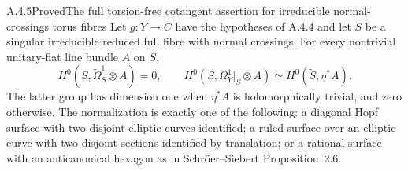 \begin{statement}{A.4.5}{Proved}{The full torsion-free cotangent assertion for irreducible normal-crossings torus fibres}
Let $g:Y\to C$ have the hypotheses of A.4.4 and let $S$ be a singular irreducible reduced full fibre with normal crossings. For every nontrivial unitary-flat line bundle $A$ on $S$,
\[
H^0(S,\widetilde\Omega_S^1\otimes A)=0,
\qquad
H^0(S,\Omega_Y^1|_S\otimes A)
 \simeq H^0(\widetilde S,\eta^*A).
\tag{A.17}
\]
The latter group has dimension one when $\eta^*A$ is holomorphically trivial, and zero otherwise. The normalization is exactly one of the following: a diagonal Hopf surface with two disjoint elliptic curves identified; a ruled surface over an elliptic curve with two disjoint sections identified by translation; or a rational surface with an anticanonical hexagon as in Schr\"oer--Siebert Proposition~2.6.
\end{statement}
